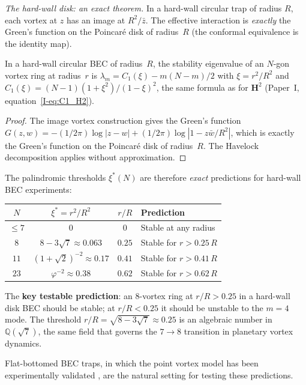 \emph{The hard-wall disk: an exact theorem.}
In a hard-wall circular trap of radius $R$, each
vortex at $z$ has an image at $R^2/\bar{z}$.
The effective interaction is \emph{exactly} the Green's
function on the Poincar\'e disk of radius~$R$
(the conformal equivalence is the identity map).
\begin{proposition}[Hard-wall BEC = Poincar\'e disk]
\label{prop:bec-disk}
In a hard-wall circular BEC of radius~$R$, the
stability eigenvalue of an $N$-gon vortex ring at
radius~$r$ is $\lambda_m = C_1(\xi) - m(N{-}m)/2$
with $\xi = r^2/R^2$ and
$C_1(\xi) = (N{-}1)(1{+}\xi^2)/(1{-}\xi)^2$, the
same formula as for $\mathbf{H}^2$
(Paper~I, equation~\ref{I-eq:C1_H2}).
\end{proposition}
\begin{proof}
The image vortex construction gives the Green's function
$G(z,w) = -(1/2\pi)\log|z{-}w| + (1/2\pi)\log|1{-}z\bar{w}/R^2|$,
which is exactly the Green's function on the Poincar\'e
disk of radius~$R$.
The Havelock decomposition applies without approximation.
\end{proof}

The palindromic thresholds $\xi^*(N)$ are therefore
\emph{exact} predictions for hard-wall BEC experiments:
\begin{center}
\small
\begin{tabular}{cccl}
\toprule
$N$ & $\xi^* = r^2/R^2$ & $r/R$ & Prediction \\
\midrule
$\le 7$ & $0$ & $0$ & Stable at any radius \\
$8$  & $8{-}3\sqrt{7} \approx 0.063$ & $0.25$ &
  Stable for $r > 0.25\,R$ \\
$11$ & $(1{+}\sqrt{2})^{-2} \approx 0.17$ & $0.41$ &
  Stable for $r > 0.41\,R$ \\
$23$ & $\varphi^{-2} \approx 0.38$ & $0.62$ &
  Stable for $r > 0.62\,R$ \\
\bottomrule
\end{tabular}
\end{center}
The \textbf{key testable prediction}: an $8$-vortex ring at
$r/R > 0.25$ in a hard-wall disk BEC should be stable;
at $r/R < 0.25$ it should be unstable to the $m = 4$ mode.
The threshold $r/R = \sqrt{8{-}3\sqrt{7}} \approx 0.25$ is an
algebraic number in $\mathbb{Q}(\sqrt{7})$, the same field
that governs the $7 \to 8$ transition in planetary vortex dynamics.

Flat-bottomed BEC traps, in which the point vortex model has
been experimentally validated
\citep{Gauthier2019}, are the natural setting for testing
these predictions.

